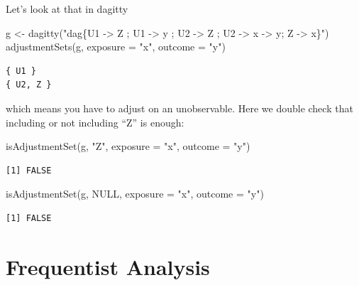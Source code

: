 \documentclass[
  11pt,
  ignorenonframetext,
]{beamer}
\newenvironment{Shaded}{\begin{snugshade}}{\end{snugshade}}
\newcommand{\AttributeTok}[1]{\textcolor[rgb]{0.40,0.45,0.13}{#1}}
\newcommand{\ConstantTok}[1]{\textcolor[rgb]{0.56,0.35,0.01}{#1}}
\newcommand{\FunctionTok}[1]{\textcolor[rgb]{0.28,0.35,0.67}{#1}}
\newcommand{\NormalTok}[1]{\textcolor[rgb]{0.00,0.23,0.31}{#1}}
\newcommand{\OtherTok}[1]{\textcolor[rgb]{0.00,0.23,0.31}{#1}}
\newcommand{\StringTok}[1]{\textcolor[rgb]{0.13,0.47,0.30}{#1}}
\begin{document}
\begin{frame}[fragile]{Let's look at that in dagitty}
\protect\hypertarget{lets-look-at-that-in-dagitty-1}{}
\begin{Shaded}
\begin{Highlighting}[]
\NormalTok{g }\OtherTok{\textless{}{-}} \FunctionTok{dagitty}\NormalTok{(}\StringTok{"dag\{U1 {-}\textgreater{} Z  ; U1 {-}\textgreater{} y ; }
\StringTok{             U2 {-}\textgreater{} Z ; U2 {-}\textgreater{} x  {-}\textgreater{} y; }
\StringTok{             Z {-}\textgreater{} x\}"}\NormalTok{)}
\FunctionTok{adjustmentSets}\NormalTok{(g, }\AttributeTok{exposure =} \StringTok{"x"}\NormalTok{, }\AttributeTok{outcome =} \StringTok{"y"}\NormalTok{)}
\end{Highlighting}
\end{Shaded}

\begin{verbatim}
{ U1 }
{ U2, Z }
\end{verbatim}

which means you have to adjust on an unobservable. Here we double check
that including or not including ``Z'' is enough:

\begin{Shaded}
\begin{Highlighting}[]
\FunctionTok{isAdjustmentSet}\NormalTok{(g, }\StringTok{"Z"}\NormalTok{, }\AttributeTok{exposure =} \StringTok{"x"}\NormalTok{, }\AttributeTok{outcome =} \StringTok{"y"}\NormalTok{)}
\end{Highlighting}
\end{Shaded}

\begin{verbatim}
[1] FALSE
\end{verbatim}

\begin{Shaded}
\begin{Highlighting}[]
\FunctionTok{isAdjustmentSet}\NormalTok{(g, }\ConstantTok{NULL}\NormalTok{, }\AttributeTok{exposure =} \StringTok{"x"}\NormalTok{, }\AttributeTok{outcome =} \StringTok{"y"}\NormalTok{)}
\end{Highlighting}
\end{Shaded}

\begin{verbatim}
[1] FALSE
\end{verbatim}
\end{frame}

\hypertarget{frequentist-analysis}{%
\section{\texorpdfstring{Frequentist Analysis
\label{L_inference}}{Frequentist Analysis }}\label{frequentist-analysis}}
\end{document}
